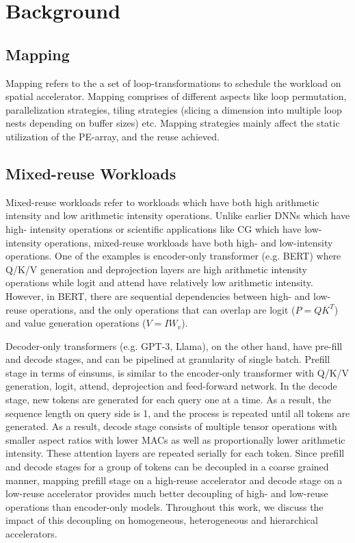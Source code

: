 \section{Background}
\label{sec:background}

\subsection{Mapping}

Mapping refers to the a set of loop-transformations to schedule the workload on spatial accelerator. Mapping comprises of different aspects like loop permutation, parallelization strategies, tiling strategies (slicing a dimension into multiple loop nests depending on buffer sizes) etc. Mapping strategies mainly affect the static utilization of the PE-array, and the reuse achieved.

\subsection{Mixed-reuse Workloads}

Mixed-reuse workloads refer to workloads which have both high arithmetic intensity and low arithmetic intensity operations. Unlike earlier DNNs which have high- intensity operations or scientific applications like CG which have low- intensity operations, mixed-reuse workloads have both high- and low-intensity operations. One of the examples is encoder-only transformer (e.g. BERT) where Q/K/V generation and deprojection layers are high arithmetic intensity operations while logit and attend have relatively low arithmetic intensity. However, in BERT, there are sequential dependencies between high- and low-reuse operations, and the only operations that can overlap are logit ($P=QK^T$) and value generation operations ($V=IW_v$).



Decoder-only transformers (e.g. GPT-3, Llama), on the other hand, have pre-fill and decode stages, and can be pipelined at granularity of single batch. Prefill stage in terms of einsums, is similar to the encoder-only transformer with Q/K/V generation, logit, attend, deprojection and feed-forward network. In the decode stage, new tokens are generated for each query one at a time. As a result, the sequence length on query side is 1, and the process is repeated until all tokens are generated. As a result, decode stage consists of multiple tensor operations with smaller aspect ratios with lower MACs as well as proportionally lower arithmetic intensity. These attention layers are repeated serially for each token. Since prefill and decode stages for a group of tokens can be decoupled in a coarse grained manner, mapping prefill stage on a high-reuse accelerator and decode stage on a low-reuse accelerator provides much better decoupling of high- and low-reuse operations than encoder-only models. Throughout this work, we discuss the impact of this decoupling on homogeneous, heterogeneous and hierarchical accelerators.
